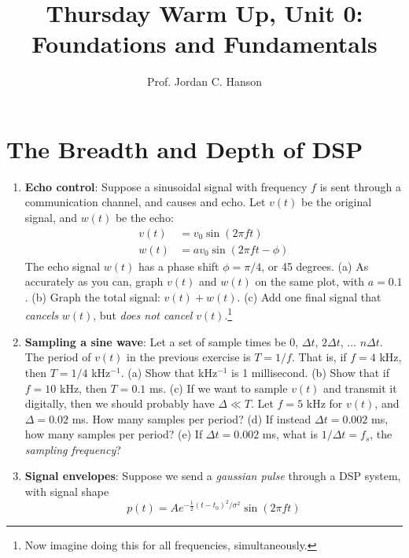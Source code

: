 \documentclass{article}
\begin{document}
\twocolumn

\title{Thursday Warm Up, Unit 0: Foundations and Fundamentals}
\author{Prof. Jordan C. Hanson}
\maketitle

\section{The Breadth and Depth of DSP}

\begin{enumerate}
\item \textbf{Echo control}: Suppose a sinusoidal signal with frequency $f$ is sent through a communication channel, and causes and echo.  Let $v(t)$ be the original signal, and $w(t)$ be the echo:
\begin{align}
v(t) &= v_0 \sin(2\pi ft) \\
w(t) &= a v_0 \sin(2\pi ft - \phi)
\end{align}
The echo signal $w(t)$ has a phase shift $\phi=\pi/4$, or 45 degrees. (a) As accurately as you can, graph $v(t)$ and $w(t)$ on the same plot, with $a = 0.1$.  (b)  Graph the total signal: $v(t) + w(t)$.  (c) Add one final signal that \textit{cancels} $w(t)$, but \textit{does not cancel} $v(t)$.\footnote{Now imagine doing this for all frequencies, simultaneously.} \\ \vspace{4cm}
\item \textbf{Sampling a sine wave}: Let a set of sample times be $0$, $\Delta t$, $2\Delta t$, ... $n\Delta t$.  The period of $v(t)$ in the previous exercise is $T = 1/f$.  That is, if $f = 4$ kHz, then $T = 1/4$ kHz$^{-1}$. (a) Show that kHz$^{-1}$ is 1 millisecond.  (b) Show that if $f = 10$ kHz, then $T = 0.1$ ms. (c) If we want to sample $v(t)$ and transmit it digitally, then we should probably have $\Delta \ll T$.  Let $f = 5$ kHz for $v(t)$, and $\Delta = 0.02$ ms.  How many samples per period? (d) If instead $\Delta t = 0.002$ ms, how many samples per period? (e) If $\Delta t = 0.002$ ms, what is $1/\Delta t = f_s$, the \textit{sampling frequency}? \\ \vspace{4cm}
\item \textbf{Signal envelopes}: Suppose we send a \textit{gaussian pulse} through a DSP system, with signal shape 
\begin{equation}
p(t) = A e^{-\frac{1}{2}(t-t_0)^2/\sigma^2} \sin(2\pi ft)

\end{equation}
\end{enumerate}
\end{document}
